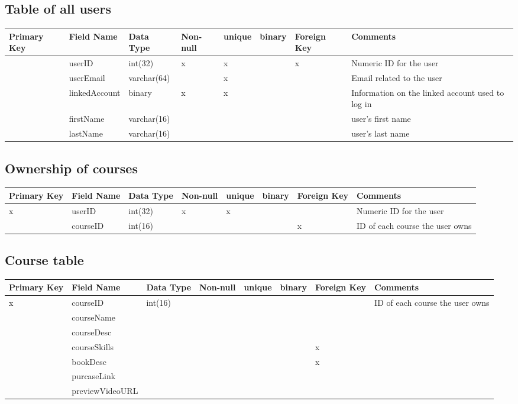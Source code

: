 \documentclass{article}
\begin{document}
\subsection{Table of all users}
\begin{tabular}{|m{1cm} | m{2cm} | m{1.5cm}| m{1cm} | m{1cm}| m{1cm} | m{1cm}| m{4cm}| }
  \hline
  Primary Key & Field Name & Data Type & Non-null & unique & binary & Foreign Key & Comments\\ 
  \hline
   & userID & int(32) & x & x & & x & Numeric ID for the user\\
  \hline
   & userEmail & varchar(64) & & x & & & Email related to the user\\
  \hline
   & linkedAccount & binary & x & x & & & Information on the linked account used to log in\\
  \hline
   & firstName & varchar(16) & & & & & user's first name\\
  \hline
   & lastName & varchar(16) & & & & & user's last name\\
  \hline
\end{tabular}

\subsection{Ownership of courses}
\begin{tabular}{|m{1cm} | m{2cm} | m{1.5cm}| m{1cm} | m{1cm}| m{1cm} | m{1cm}| m{4cm}| }
  \hline
  Primary Key & Field Name & Data Type & Non-null & unique & binary & Foreign Key & Comments\\ 
  \hline
  x & userID & int(32) & x & x & & & Numeric ID for the user\\
  \hline
   & courseID & int(16) & & & & x & ID of each course the user owns\\
  \hline
\end{tabular}

\subsection{Course table}
\begin{tabular}{|m{1cm} | m{2cm} | m{1.5cm}| m{1cm} | m{1cm}| m{1cm} | m{1cm}| m{4cm}| }
  \hline
  Primary Key & Field Name & Data Type & Non-null & unique & binary & Foreign Key & Comments\\ 
  \hline
  x & courseID & int(16) & & & & & ID of each course the user owns\\
  \hline
   & courseName & & & & & &\\
  \hline
   & courseDesc & & & & & &\\
  \hline
   & courseSkills & & & & & x &\\
  \hline
   & bookDesc & & & & & x &\\
  \hline
   & purcaseLink & & & & & &\\
  \hline
   & previewVideoURL & & & & & &\\
  \hline
\end{tabular}
\end{document}
